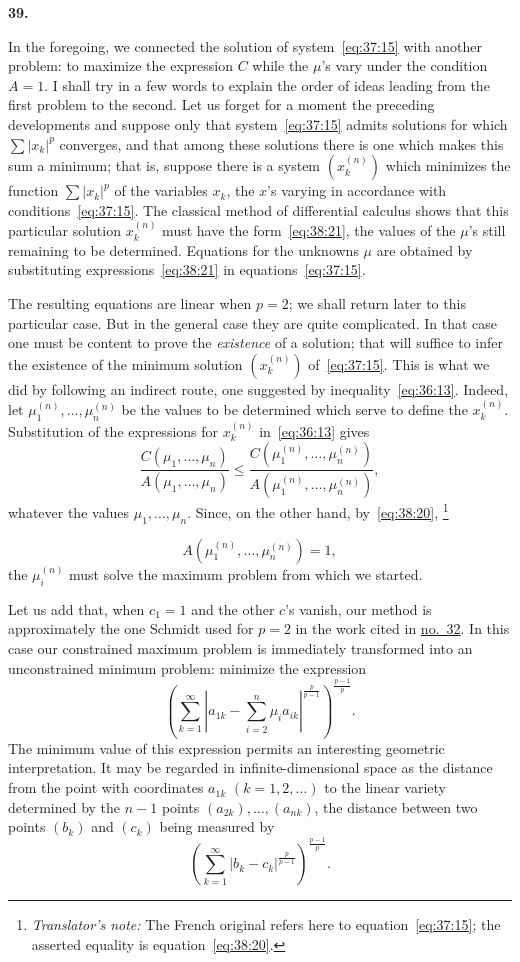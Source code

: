 \documentclass[
  paper=b5,
  fontsize=13pt,
  twoside=true,
  open=any,
  bookmarkpackage=false,
  chapterprefix=true,
  headings=normal
]{scrbook}
\theoremstyle{definition}
\newcommand{\numberedparagraph}[1]{%
  \par\medskip\phantomsection\label{sec:#1}%
  \noindent\textbf{#1.}\enspace
}
\newcounter{translatornote}
\newcommand{\translatornotelabel}{T\arabic{translatornote}}
\newcommand{\translatornote}[1]{%
  \stepcounter{translatornote}%
  \begingroup
    \edef\savedfootnotenumber{\number\value{footnote}}%
    \renewcommand{\thefootnote}{\translatornotelabel}%
    \footnote{\emph{Translator's note:} #1}%
    \setcounter{footnote}{\savedfootnotenumber}%
  \endgroup
}
\begin{document}
\numberedparagraph{39}
In the foregoing, we connected the solution of system~\eqref{eq:37:15} with another problem: to maximize the expression $C$ while the $\mu$'s vary under the condition $A=1$. I shall try in a few
words to explain the order of ideas leading from the first problem to the second. Let us forget for a moment the preceding developments and suppose only that system~\eqref{eq:37:15} admits solutions for which $\sum|x_k|^p$ converges, and that among these solutions there is one which makes this sum a minimum; that is, suppose there is a system $(x_k^{(n)})$ which minimizes the function $\sum|x_k|^p$ of the variables $x_k$, the $x$'s varying in accordance with conditions~\eqref{eq:37:15}. The classical method of differential calculus shows that this particular solution $x_k^{(n)}$ must have the form~\eqref{eq:38:21}, the values of the $\mu$'s still remaining to be determined. Equations for the unknowns $\mu$ are obtained by substituting expressions~\eqref{eq:38:21} in equations~\eqref{eq:37:15}.

The resulting equations are linear when $p=2$; we shall return later to this particular case. But in the general case they are quite complicated. In that case one must be content to prove the \emph{existence} of a solution; that will suffice to infer the existence of the minimum solution $(x_k^{(n)})$ of~\eqref{eq:37:15}. This is what we did by following an indirect route, one suggested by inequality~\eqref{eq:36:13}. Indeed, let $\mu_1^{(n)},\ldots,\mu_n^{(n)}$ be the values to be determined which serve to define the $x_k^{(n)}$. Substitution of the expressions for $x_k^{(n)}$ in~\eqref{eq:36:13} gives
\[
 \frac{C(\mu_1,\ldots,\mu_n)}{A(\mu_1,\ldots,\mu_n)}
 \leq
 \frac{C(\mu_1^{(n)},\ldots,\mu_n^{(n)})}
      {A(\mu_1^{(n)},\ldots,\mu_n^{(n)})},
\]
whatever the values $\mu_1,\ldots,\mu_n$. Since, on the other hand, by~\eqref{eq:38:20},\translatornote{The French original refers here to equation~\eqref{eq:37:15}; the asserted equality is equation~\eqref{eq:38:20}.}
\[
 A(\mu_1^{(n)},\ldots,\mu_n^{(n)})=1,
\]
the $\mu_i^{(n)}$ must solve the maximum problem from which we started.

Let us add that, when $c_1=1$ and the other $c$'s vanish, our method is approximately the one Schmidt used for $p=2$ in the work cited in \hyperref[sec:32]{no.~32}. In this case our constrained maximum problem is immediately transformed into an unconstrained minimum problem: minimize the expression
\[
 \left(
  \sum_{k=1}^{\infty}
  \left|a_{1k}-\sum_{i=2}^{n}\mu_i a_{ik}\right|^{\frac{p}{p-1}}
 \right)^{\frac{p-1}{p}}.
\]
The minimum value of this expression permits an interesting geometric interpretation. It may be regarded
in infinite-dimensional space as the distance from the point with coordinates $a_{1k}$ $(k=1,2,\ldots)$ to the linear variety determined by the $n-1$ points $(a_{2k}),\ldots,(a_{nk})$, the distance between two points $(b_k)$ and $(c_k)$ being measured by
\[
 \left(\sum_{k=1}^{\infty}|b_k-c_k|^{\frac{p}{p-1}}\right)^{\frac{p-1}{p}}.
\]
\end{document}
